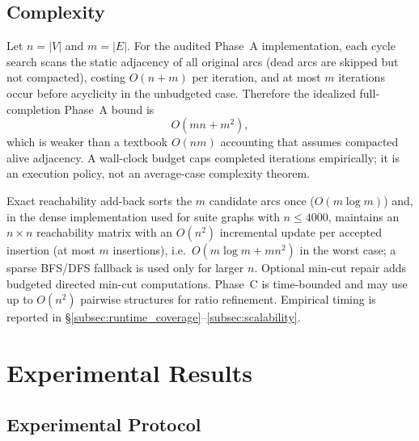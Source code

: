 \documentclass{article}
\begin{document}
\subsection{Complexity}
\label{subsec:framework_complexity}
Let $n=|V|$ and $m=|E|$. For the audited Phase~A implementation, each cycle search scans the static adjacency of all original arcs (dead arcs are skipped but not compacted), costing $O(n+m)$ per iteration, and at most $m$ iterations occur before acyclicity in the unbudgeted case. Therefore the idealized full-completion Phase~A bound is
\[
O(mn+m^2),
\]
which is weaker than a textbook $O(nm)$ accounting that assumes compacted alive adjacency. A wall-clock budget caps completed iterations empirically; it is an execution policy, not an average-case complexity theorem.

Exact reachability add-back sorts the $m$ candidate arcs once ($O(m\log m)$) and, in the dense implementation used for suite graphs with $n\le 4000$, maintains an $n\times n$ reachability matrix with an $O(n^{2})$ incremental update per accepted insertion (at most $m$ insertions), i.e.\ $O(m\log m+mn^{2})$ in the worst case; a sparse BFS/DFS fallback is used only for larger $n$. Optional min-cut repair adds budgeted directed min-cut computations. Phase~C is time-bounded and may use up to $O(n^2)$ pairwise structures for ratio refinement. Empirical timing is reported in \S\ref{subsec:runtime_coverage}--\ref{subsec:scalability}.

\section{Experimental Results}
\label{sec:exp}

\subsection{Experimental Protocol}
\label{subsec:exp_setup}
\end{document}
